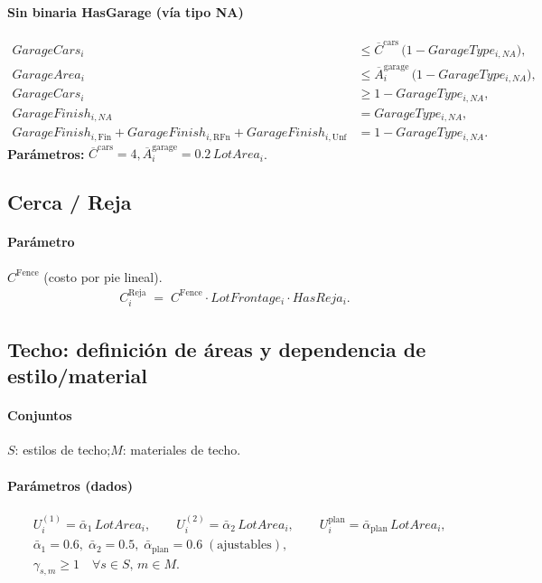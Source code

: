 \paragraph{Sin binaria HasGarage (vía tipo NA)}
\begin{align}
GarageCars_i &\le \overline{C}^{\text{cars}} \,\big(1 - GarageType_{i,NA}\big),\\
GarageArea_i &\le \overline{A}^{\text{garage}}_i \,\big(1 - GarageType_{i,NA}\big),\\
GarageCars_i &\ge 1 - GarageType_{i,NA},\\
GarageFinish_{i,NA} &= GarageType_{i,NA},\\
GarageFinish_{i,\text{Fin}} + GarageFinish_{i,\text{RFn}} + GarageFinish_{i,\text{Unf}}
  &= 1 - GarageType_{i,NA}.
\end{align}
\textbf{Parámetros:}\;
$\overline{C}^{\text{cars}}=4,$\quad $\overline{A}^{\text{garage}}_i=0.2\,LotArea_i$.

\subsection{Cerca / Reja}
\paragraph{Parámetro} $C^{\text{Fence}}$ (costo por pie lineal).
\begin{align}
C^{\text{Reja}}_{i} \;=\; C^{\text{Fence}}\cdot LotFrontage_{i}\cdot HasReja_{i}.
\end{align}

\subsection{Techo: definición de áreas y dependencia de estilo/material}

\paragraph{Conjuntos} 
$S$: estilos de techo;\quad $M$: materiales de techo.

\paragraph{Parámetros (dados)}
\begin{align*}
&U^{(1)}_i = \bar{\alpha}_{1}\, LotArea_i,\qquad
U^{(2)}_i = \bar{\alpha}_{2}\, LotArea_i,\qquad
U^{\text{plan}}_i = \bar{\alpha}_{\text{plan}}\, LotArea_i,\\
&\bar{\alpha}_{1}=0.6,\;\bar{\alpha}_{2}=0.5,\;\bar{\alpha}_{\text{plan}}=0.6\; (\text{ajustables}),\\
&\gamma_{s,m}\ge 1\quad \forall s\in S,\, m\in M.
\end{align*}

